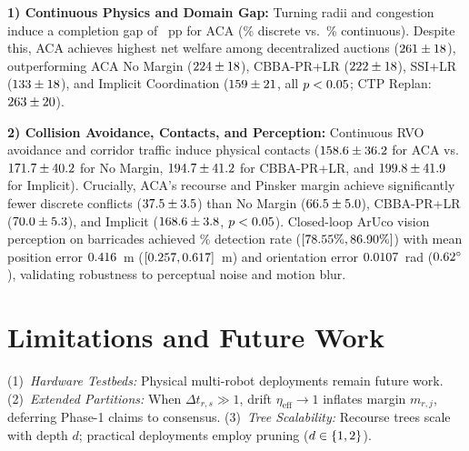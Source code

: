 \documentclass[lettersize,journal]{IEEEtran}
\begin{document}
\noindent\textbf{1) Continuous Physics and Domain Gap:} Turning radii and congestion induce a completion gap of \aeSitlDomainGap~pp for ACA (\aeSitlGraphComp\% discrete vs.\ \aeSitlAcaComp\% continuous). Despite this, ACA achieves highest net welfare among decentralized auctions ($261 \pm 18$), outperforming ACA No Margin ($224 \pm 18$), CBBA-PR+LR ($222 \pm 18$), SSI+LR ($133 \pm 18$), and Implicit Coordination ($159 \pm 21$, all $p < 0.05$; CTP Replan: $263 \pm 20$).

\noindent\textbf{2) Collision Avoidance, Contacts, and Perception:} Continuous RVO avoidance and corridor traffic induce physical contacts ($158.6 \pm 36.2$ for ACA vs.\ $171.7 \pm 40.2$ for No Margin, $194.7 \pm 41.2$ for CBBA-PR+LR, and $199.8 \pm 41.9$ for Implicit). Crucially, ACA's recourse and Pinsker margin achieve significantly fewer discrete conflicts ($37.5 \pm 3.5$) than No Margin ($66.5 \pm 5.0$), CBBA-PR+LR ($70.0 \pm 5.3$), and Implicit ($168.6 \pm 3.8$, $p < 0.05$). Closed-loop ArUco vision perception on barricades achieved \aeVisionDetectionRate\% detection rate ($[78.55\%, 86.90\%]$) with mean position error $0.416$~m ($[0.257, 0.617]$~m) and orientation error $0.0107$~rad ($0.62^\circ$), validating robustness to perceptual noise and motion blur.

\section{Limitations and Future Work}
(1)~\textit{Hardware Testbeds:} Physical multi-robot deployments remain future work. (2)~\textit{Extended Partitions:} When $\Delta t_{r,s} \gg 1$, drift $\eta_{\text{eff}} \to 1$ inflates margin $m_{r,j}$, deferring Phase-1 claims to consensus. (3)~\textit{Tree Scalability:} Recourse trees scale with depth $d$; practical deployments employ pruning ($d \in \{1, 2\}$).
\end{document}
